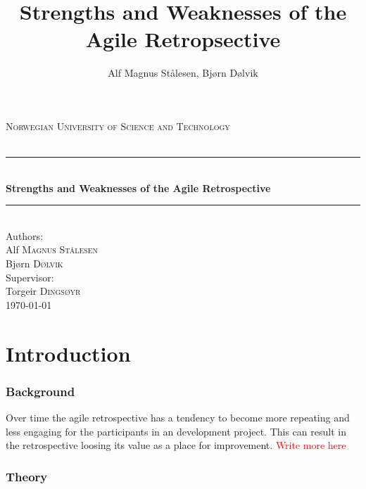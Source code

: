 \documentclass[12pt]{article}
\newcommand\todo[1]{\textcolor{red}{#1}}
\newcommand{\HRule}{\rule{\linewidth}{0.5mm}}
\begin{document}
\title{Strengths and Weaknesses of the Agile Retropsective}

\author{Alf Magnus Stålesen, Bjørn Dølvik}
\begin{titlepage}
\begin{center}

\textsc{\LARGE Norwegian University of Science and Technology}\\[1.5cm]

\textsc{\Large }\\[0.5cm]

\HRule \\[0.4cm]
{ \huge \bfseries Strengths and Weaknesses of the Agile Retrospective\\[0.4cm] }

\HRule \\[1.5cm]

{\large Authors:}\\

Alf \textsc{Magnus Stålesen}\\
Bjørn \textsc{Dølvik}\\[1.0cm]

{\large Supervisor:}\\

Torgeir \textsc{Dingsøyr}\\[1.0cm]

{\large \today}

\end{center}
\end{titlepage}

\begin{abstract}
\end{abstract}
\clearpage

\tableofcontents
\clearpage

\part{Introduction}
\section{Background}
Over time the agile retrospective has a tendency to become more repeating and less engaging for the participants in an development project. This can result in the retrospective loosing its value as a place for improvement. 
\todo{Write more here}
\section{Theory}
\end{document}
